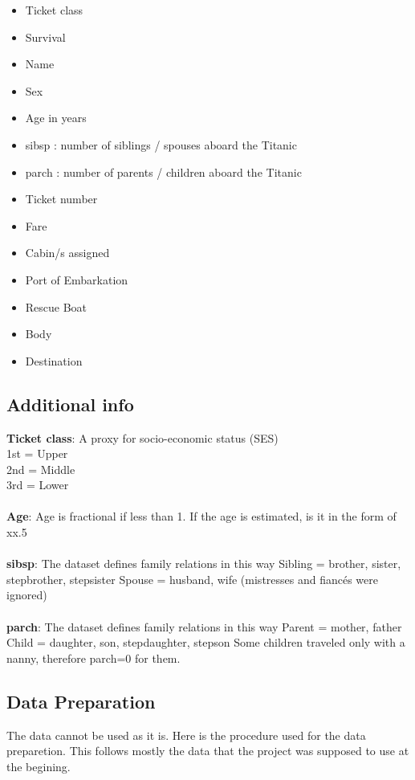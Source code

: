 \documentclass{article}
\begin{document}
\begin{itemize}
\item Ticket class
\item Survival 
\item Name
\item Sex
\item Age in years
\item sibsp : number of siblings / spouses aboard the Titanic
\item parch : number of parents / children aboard the Titanic
\item Ticket number	
\item Fare
\item Cabin/s assigned
\item Port of Embarkation	
\item Rescue Boat
\item Body
\item Destination
\end{itemize}

\subsection{Additional info}
\textbf{Ticket class}: A proxy for socio-economic status (SES)\\
1st = Upper\\
2nd = Middle\\
3rd = Lower\\
\\
\textbf{Age}: Age is fractional if less than 1. If the age is estimated, is it in the form of xx.5
\\\\
\textbf{sibsp}: The dataset defines family relations in this way
Sibling = brother, sister, stepbrother, stepsister
Spouse = husband, wife (mistresses and fiancés were ignored)
\\\\
\textbf{parch}: The dataset defines family relations in this way
Parent = mother, father
Child = daughter, son, stepdaughter, stepson
Some children traveled only with a nanny, therefore parch=0 for them.


\subsection{Data Preparation}
The data cannot be used as it is. Here is the procedure used for the data preparetion. This follows mostly the data that the project was supposed to use at the begining.
\end{document}
